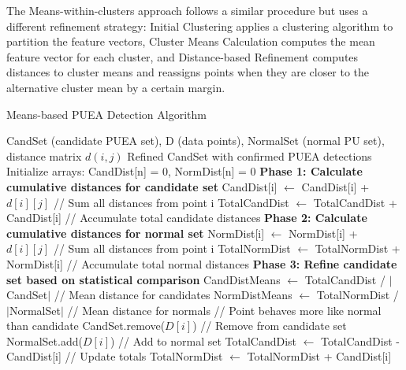 \documentclass[pdflatex,sn-mathphys-num]{sn-jnl}%
\theoremstyle{thmstyleone}
\theoremstyle{thmstyletwo}
\theoremstyle{thmstylethree}
\begin{document}
The Means-within-clusters approach follows a similar procedure but uses a different refinement strategy: Initial Clustering applies a clustering algorithm to partition the feature vectors, Cluster Means Calculation computes the mean feature vector for each cluster, and Distance-based Refinement computes distances to cluster means and reassigns points when they are closer to the alternative cluster mean by a certain margin.

\begin{algorithm}[H]
\caption{Means-based PUEA Detection Algorithm}
\label{alg:means}
\begin{algorithmic}[1]
\Require CandSet (candidate PUEA set), D (data points), NormalSet (normal PU set), distance matrix $d(i,j)$
\Ensure Refined CandSet with confirmed PUEA detections
\State
\State Initialize arrays: CandDist[n] = 0, NormDist[n] = 0
\State
\State \textbf{Phase 1: Calculate cumulative distances for candidate set}
        \State CandDist[i] $\leftarrow$ CandDist[i] + $d[i][j]$ \hfill // Sum all distances from point i
    \EndFor
    \State TotalCandDist $\leftarrow$ TotalCandDist + CandDist[i] \hfill // Accumulate total candidate distances
\EndFor
\State
\State \textbf{Phase 2: Calculate cumulative distances for normal set}
        \State NormDist[i] $\leftarrow$ NormDist[i] + $d[i][j]$ \hfill // Sum all distances from point i
    \EndFor
    \State TotalNormDist $\leftarrow$ TotalNormDist + NormDist[i] \hfill // Accumulate total normal distances
\EndFor
\State
\State \textbf{Phase 3: Refine candidate set based on statistical comparison}
    \State CandDistMeans $\leftarrow$ TotalCandDist / $|$CandSet$|$ \hfill // Mean distance for candidates
    \State NormDistMeans $\leftarrow$ TotalNormDist / $|$NormalSet$|$ \hfill // Mean distance for normals
        \State \hfill // Point behaves more like normal than candidate
        \State CandSet.remove($D[i]$) \hfill // Remove from candidate set
        \State NormalSet.add($D[i]$) \hfill // Add to normal set
        \State TotalCandDist $\leftarrow$ TotalCandDist - CandDist[i] \hfill // Update totals
        \State TotalNormDist $\leftarrow$ TotalNormDist + CandDist[i]
    \EndIf
\EndFor
\end{algorithmic}
\end{algorithm}
\end{document}
